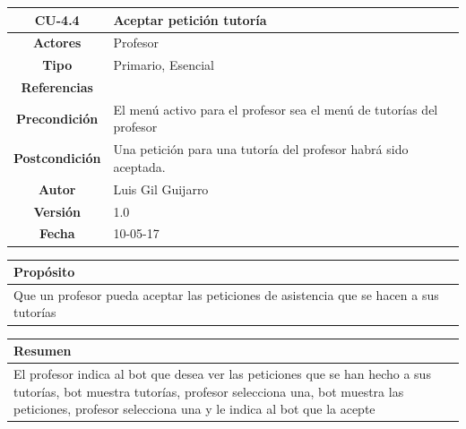 \begin{table}[!ht]

\begin{tabular}{|c|m{10cm}|}
\hline\rowcolor{Gray}
{\bf CU-4.4 } & { Aceptar petición tutoría}\\
\hline
{\bf Actores } & { Profesor} \\
\hline\rowcolor{Gray}
{\bf Tipo } & { Primario, Esencial} \\
\hline
{\bf Referencias }& {} \\
\hline\rowcolor{Gray}
{\bf Precondición }& {El menú activo para el profesor sea el menú de tutorías del profesor} \\
\hline
{\bf Postcondición }& {Una petición para una tutoría del profesor habrá sido aceptada.}\\
\hline\rowcolor{Gray}
{\bf Autor }& { Luis Gil Guijarro}  \\
\hline
{\bf Versión }& { 1.0} \\
\hline\rowcolor{Gray}
{\bf Fecha }& { 10-05-17} \\
\hline
\end{tabular}

\end{table}

\begin{table}[!ht]

\begin{tabular}{|m{10cm}|}
\hline\rowcolor{Gray}
{\bf Propósito}\\
\hline
{Que un profesor pueda aceptar las peticiones de asistencia que se hacen a sus tutorías} \\
\hline

\end{tabular}


\end{table}

\begin{table}[!ht]

\begin{tabular}{|m{10cm}|}
\hline\rowcolor{Gray}
{\bf Resumen}\\
\hline
{El profesor indica al bot que desea ver las peticiones que se han hecho a sus tutorías, bot muestra tutorías, profesor selecciona una, bot muestra las peticiones, profesor selecciona una y le indica al bot que la acepte} \\
\hline

\end{tabular}



\end{table}

